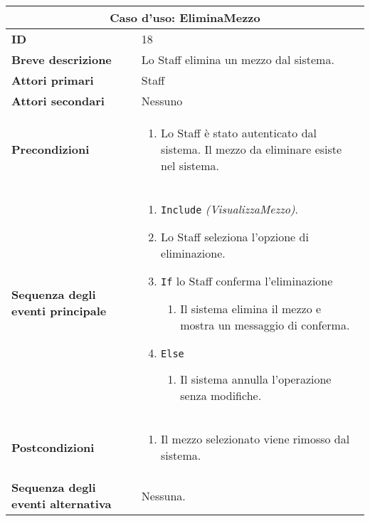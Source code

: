 \documentclass[a4paper]{report}
\begin{document}
\clearpage
\begin{table}[H]
\vspace*{-0cm}
\renewcommand{\arraystretch}{1.9}
\begin{tabular}{|p{3.9cm}|p{9.9cm}|}
\hline
\multicolumn{2}{|c|}{\textbf{Caso d’uso: EliminaMezzo}} \\ \hline
	\textbf{ID} & 18 \\ \hline
	\textbf{Breve descrizione} & Lo Staff elimina un mezzo dal sistema. \\ \hline
	\textbf{Attori primari} & Staff \\ \hline
	\textbf{Attori secondari} & Nessuno \\ \hline
	\textbf{Precondizioni} & \begin{enumerate}[label=\arabic*.,leftmargin=14pt,labelsep=0.5em,topsep=0pt,partopsep=0pt,parsep=0pt,itemsep=0pt]
        \item Lo Staff è stato autenticato dal sistema. Il mezzo da eliminare esiste nel sistema.
    \end{enumerate} \\ \hline
	\textbf{Sequenza degli eventi principale} & 
\begin{enumerate}[leftmargin=14pt,label=\arabic*.,labelsep=0.5em,topsep=0pt,partopsep=0pt,parsep=0pt,itemsep=0pt]
    \item \texttt{Include} \textit{(VisualizzaMezzo)}.
    \item Lo Staff seleziona l’opzione di eliminazione.
    \item \texttt{If} lo Staff conferma l’eliminazione
    \begin{enumerate}[label=\arabic{enumi}.\arabic*.,leftmargin=22pt,labelsep=0.5em,topsep=0pt,partopsep=0pt,parsep=0pt,itemsep=0pt]
        \item Il sistema elimina il mezzo e mostra un messaggio di conferma.
    \end{enumerate}
    \item \texttt{Else}
    \begin{enumerate}[label=\arabic{enumi}.\arabic*.,leftmargin=22pt,labelsep=0.5em,topsep=0pt,partopsep=0pt,parsep=0pt,itemsep=0pt]
        \item Il sistema annulla l’operazione senza modifiche.
    \end{enumerate}
\end{enumerate}\\ \hline
    	\textbf{Postcondizioni} & \begin{enumerate}[label=\arabic*.,leftmargin=14pt,labelsep=0.5em,topsep=0pt,partopsep=0pt,parsep=0pt,itemsep=0pt]
        \item Il mezzo selezionato viene rimosso dal sistema.
        \end{enumerate} \\ \hline
    	\textbf{Sequenza degli eventi alternativa} & Nessuna. \\ \hline
\end{tabular}
\end{table}
\end{document}

